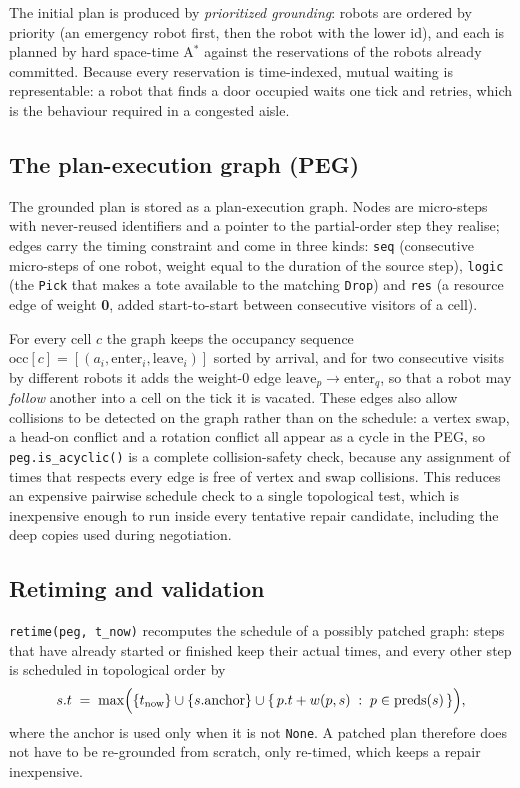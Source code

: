 \documentclass[10pt,a4paper]{article}
\newcommand{\code}[1]{\texttt{#1}}
\begin{document}
The initial plan is produced by \emph{prioritized grounding}: robots are
ordered by priority (an emergency robot first, then the robot with the lower
id), and each is planned by hard space-time A$^\ast$ against the reservations
of the robots already committed.  Because every reservation is time-indexed,
mutual waiting is representable: a robot that finds a door occupied waits one
tick and retries, which is the behaviour required in a congested aisle.

\subsection{The plan-execution graph (PEG)}

The grounded plan is stored as a plan-execution graph.  Nodes are micro-steps
with never-reused identifiers and a pointer to the partial-order step they
realise; edges carry the timing constraint and come in three kinds: \code{seq}
(consecutive micro-steps of one robot, weight equal to the duration of the
source step), \code{logic} (the \code{Pick} that makes a tote available to the
matching \code{Drop}) and \code{res} (a resource edge of weight \textbf{0},
added start-to-start between consecutive visitors of a cell).

For every cell $c$ the graph keeps the occupancy sequence
$\mathrm{occ}[c] = [(a_i, \text{enter}_i, \text{leave}_i)]$ sorted by
arrival, and for two consecutive visits by different robots it adds the
weight-0 edge $\text{leave}_p \to \text{enter}_q$, so that a robot may
\emph{follow} another into a cell on the tick it is vacated.  These edges
also allow collisions to be detected on the graph rather than on the
schedule: a vertex swap, a head-on conflict and a rotation conflict all
appear as a cycle in the PEG, so \code{peg.is\_acyclic()} is a complete
collision-safety check, because any assignment of times that respects every
edge is free of vertex and swap collisions.  This reduces an expensive
pairwise schedule check to a single topological test, which is inexpensive
enough to run inside every tentative repair candidate, including the deep
copies used during negotiation.
\subsection{Retiming and validation}

\code{retime(peg, t\_now)} recomputes the schedule of a possibly patched
graph: steps that have already started or finished keep their actual times,
and every other step is scheduled in topological order by
%
\[
  s.t \;=\; \max\Bigl(\{t_{\text{now}}\} \cup \{s.\text{anchor}\} \cup
  \{\,p.t + w(p,s) \;:\; p \in \text{preds}(s)\,\}\Bigr),
\]
%
where the anchor is used only when it is not \code{None}.  A patched plan
therefore does not have to be re-grounded from scratch, only re-timed, which
keeps a repair inexpensive.
\end{document}
